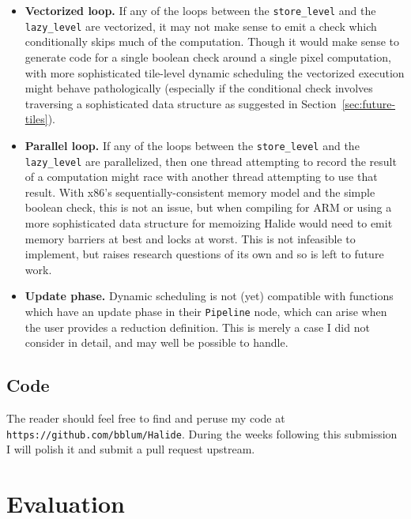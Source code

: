 \documentclass{article}
\begin{document}
\begin{itemize}
	\item {\bf Vectorized loop.} If any of the loops between the \texttt{store\_level} and the \texttt{lazy\_level} are vectorized, it may not make sense to emit a check which conditionally skips much of the computation. Though it would make sense to generate code for a single boolean check around a single pixel computation, with more sophisticated tile-level dynamic scheduling the vectorized execution might behave pathologically (especially if the conditional check involves traversing a sophisticated data structure as suggested in Section~\ref{sec:future-tiles}).
	\item {\bf Parallel loop.} If any of the loops between the \texttt{store\_level} and the \texttt{lazy\_level} are parallelized, then one thread attempting to record the result of a computation might race with another thread attempting to use that result. With x86's sequentially-consistent memory model and the simple boolean check, this is not an issue, but when compiling for ARM or using a more sophisticated data structure for memoizing Halide would need to emit memory barriers at best and locks at worst. This is not infeasible to implement, but raises research questions of its own and so is left to future work.
	\item {\bf Update phase.} Dynamic scheduling is not (yet) compatible with functions which have an update phase in their \texttt{Pipeline} node, which can arise when the user provides a reduction definition. This is merely a case I did not consider in detail, and may well be possible to handle.
\end{itemize}

\subsection{Code}

The reader should feel free to find and peruse my code at \texttt{https://github.com/bblum/Halide}. During the weeks following this submission I will polish it and submit a pull request upstream.

\section{Evaluation}

\end{document}
